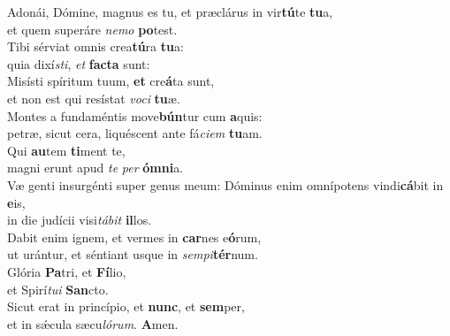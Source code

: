 \evenverse Adonái, Dómine, magnus es tu, et præclárus in vir\textbf{tú}te \textbf{tu}a,~\*\\
\evenverse et quem superáre \textit{ne}\textit{mo} \textbf{po}test.\\
\oddverse Tibi sérviat omnis crea\textbf{tú}ra \textbf{tu}a:~\*\\
\oddverse quia dixí\textit{sti}, \textit{et} \textbf{fa}\textbf{cta} sunt:\\
\evenverse Misísti spíritum tuum, \textbf{et} cre\textbf{á}ta sunt,~\*\\
\evenverse et non est qui resístat \textit{vo}\textit{ci} \textbf{tu}æ.\\
\oddverse Montes a fundaméntis move\textbf{bún}tur cum \textbf{a}quis:~\*\\
\oddverse petræ, sicut cera, liquéscent ante fá\textit{ci}\textit{em} \textbf{tu}am.\\
\evenverse Qui \textbf{au}tem \textbf{ti}ment te,~\*\\
\evenverse magni erunt apud \textit{te} \textit{per} \textbf{óm}\textbf{ni}a.\\
\oddverse Væ genti insurgénti super genus meum: Dóminus enim omnípotens vindi\textbf{cá}bit in \textbf{e}is,~\*\\
\oddverse in die judícii visi\textit{tá}\textit{bit} \textbf{il}los.\\
\evenverse Dabit enim ignem, et vermes in \textbf{car}nes e\textbf{ó}rum,~\*\\
\evenverse ut urántur, et séntiant usque in \textit{sem}\textit{pi}\textbf{tér}num.\\
\oddverse Glória \textbf{Pa}tri, et \textbf{Fí}lio,~\*\\
\oddverse et Spirí\textit{tu}\textit{i} \textbf{San}cto.\\
\evenverse Sicut erat in princípio, et \textbf{nunc}, et \textbf{sem}per,~\*\\
\evenverse et in sǽcula sæcu\textit{ló}\textit{rum}. \textbf{A}men.\\
